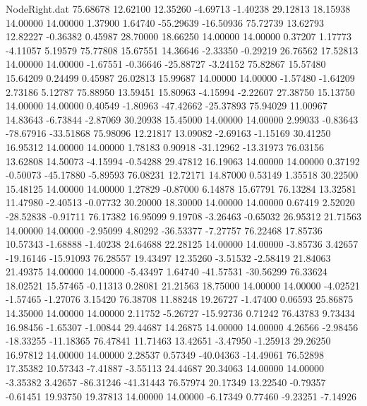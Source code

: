 \begin{filecontents}{NodeRight.dat}
  75.68678   12.62100   12.35260    -4.69713   -1.40238   29.12813   18.15938   14.00000   14.00000    1.37900    1.64740  -55.29639  -16.50936
  75.72739   13.62793   12.82227    -0.36382    0.45987   28.70000   18.66250   14.00000   14.00000    0.37207    1.17773   -4.11057    5.19579
  75.77808   15.67551   14.36646    -2.33350   -0.29219   26.76562   17.52813   14.00000   14.00000   -1.67551   -0.36646  -25.88727   -3.24152
  75.82867   15.57480   15.64209     0.24499    0.45987   26.02813   15.99687   14.00000   14.00000   -1.57480   -1.64209    2.73186    5.12787
  75.88950   13.59451   15.80963    -4.15994   -2.22607   27.38750   15.13750   14.00000   14.00000    0.40549   -1.80963  -47.42662  -25.37893
  75.94029   11.00967   14.83643    -6.73844   -2.87069   30.20938   15.45000   14.00000   14.00000    2.99033   -0.83643  -78.67916  -33.51868
  75.98096   12.21817   13.09082    -2.69163   -1.15169   30.41250   16.95312   14.00000   14.00000    1.78183    0.90918  -31.12962  -13.31973
  76.03156   13.62808   14.50073    -4.15994   -0.54288   29.47812   16.19063   14.00000   14.00000    0.37192   -0.50073  -45.17880   -5.89593
  76.08231   12.72171   14.87000     0.53149    1.35518   30.22500   15.48125   14.00000   14.00000    1.27829   -0.87000    6.14878   15.67791
  76.13284   13.32581   11.47980    -2.40513   -0.07732   30.20000   18.30000   14.00000   14.00000    0.67419    2.52020  -28.52838   -0.91711
  76.17382   16.95099    9.19708    -3.26463   -0.65032   26.95312   21.71563   14.00000   14.00000   -2.95099    4.80292  -36.53377   -7.27757
  76.22468   17.85736   10.57343    -1.68888   -1.40238   24.64688   22.28125   14.00000   14.00000   -3.85736    3.42657  -19.16146  -15.91093
  76.28557   19.43497   12.35260    -3.51532   -2.58419   21.84063   21.49375   14.00000   14.00000   -5.43497    1.64740  -41.57531  -30.56299
  76.33624   18.02521   15.57465    -0.11313    0.28081   21.21563   18.75000   14.00000   14.00000   -4.02521   -1.57465   -1.27076    3.15420
  76.38708   11.88248   19.26727    -1.47400    0.06593   25.86875   14.35000   14.00000   14.00000    2.11752   -5.26727  -15.92736    0.71242
  76.43783    9.73434   16.98456    -1.65307   -1.00844   29.44687   14.26875   14.00000   14.00000    4.26566   -2.98456  -18.33255  -11.18365
  76.47841   11.71463   13.42651    -3.47950   -1.25913   29.26250   16.97812   14.00000   14.00000    2.28537    0.57349  -40.04363  -14.49061
  76.52898   17.35382   10.57343    -7.41887   -3.55113   24.44687   20.34063   14.00000   14.00000   -3.35382    3.42657  -86.31246  -41.31443
  76.57974   20.17349   13.22540    -0.79357   -0.61451   19.93750   19.37813   14.00000   14.00000   -6.17349    0.77460   -9.23251   -7.14926

\end{filecontents}
